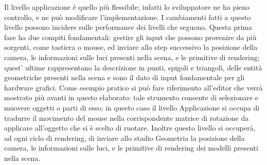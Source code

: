 Il livello applicazione è quello più flessibile; infatti lo sviluppatore ne ha pieno controllo, e ne può modificare l’implementazione. I cambiamenti fatti a questo livello possono incidere sulle performance dei livelli che seguono. 
Questa prima fase ha due compiti fondamentali: gestire gli input che possono provenire da più sorgenti, come tastiera o mouse, ed inviare allo step successivo la posizione della camera, le informazioni sulle luci presenti nella scena, e le primitive di rendering; quest’ ultime rappresentano la descrizione in punti, spigoli e triangoli, delle entità geometriche presenti nella scena e sono il dato di input fondamentale per gli hardware grafici. 
Come esempio pratico si può fare riferimento all’editor che verrà mostrato più avanti in questo elaborato: tale strumento consente di selezionare e muovere oggetti o parti di esso; in questo caso il livello Applicazione si occupa di tradurre il movimento del mouse nella corrispondente matrice di rotazione da applicare all’oggetto che si è scelto di ruotare. Inoltre questo livello si occuperà, ad ogni ciclo di rendering, di inviare allo stadio Geometria la posizione della camera, le informazioni sulle luci, e le primitive di rendering dei modelli presenti nella scena.\\

